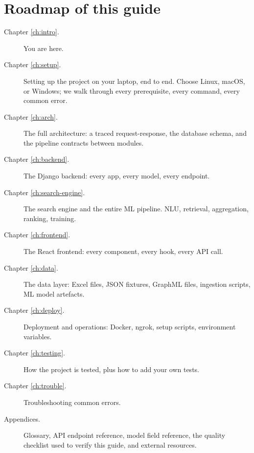 \documentclass[11pt,a4paper,oneside]{book}
\DeclareRobustCommand{\fileref}[1]{\texorpdfstring{\colorbox{filerefbg}{\strut\ttfamily\small\detokenize{#1}}}{#1}}
\begin{document}
\section{Roadmap of this guide}

\begin{description}
  \item[Chapter \ref{ch:intro}.] You are here.
  \item[Chapter \ref{ch:setup}.] Setting up the project on your laptop, end
        to end. Choose Linux, macOS, or Windows; we walk through every
        prerequisite, every command, every common error.
  \item[Chapter \ref{ch:arch}.] The full architecture: a traced
        request-response, the database schema, and the pipeline contracts
        between modules.
  \item[Chapter \ref{ch:backend}.] The Django backend: every app, every
        model, every endpoint.
  \item[Chapter \ref{ch:search-engine}.] The search engine and the entire
        ML pipeline. NLU, retrieval, aggregation, ranking, training.
  \item[Chapter \ref{ch:frontend}.] The React frontend: every component,
        every hook, every API call.
  \item[Chapter \ref{ch:data}.] The data layer: Excel files, JSON
        fixtures, GraphML files, ingestion scripts, ML model artefacts.
  \item[Chapter \ref{ch:deploy}.] Deployment and operations: Docker,
        ngrok, setup scripts, environment variables.
  \item[Chapter \ref{ch:testing}.] How the project is tested, plus how to
        add your own tests.
  \item[Chapter \ref{ch:trouble}.] Troubleshooting common errors.
  \item[Appendices.] Glossary, API endpoint reference, model field
        reference, the quality checklist used to verify this guide, and
        external resources.
\end{description}

\end{document}
